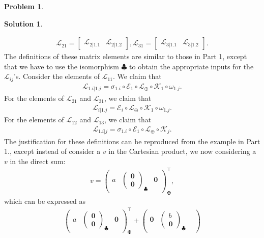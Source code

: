 \documentclass{article}
\theoremstyle{definition}
\newtheorem*{prob*}{Problem}
\newtheorem*{sln*}{Solution}
\newcommand{\lag}{\mathcal{L}}
\newcommand{\K}{\mathcal{K}}
\newcommand{\E}{\mathcal{E}}
\begin{document}
\begin{prob*}
\begin{sln*}
\begin{enumerate}
\begin{align*}
		\lag_{21} = \begin{bmatrix}
		\lag_{2|1.1}&\lag_{2|1.2}
		\end{bmatrix}, \lag_{31} = \begin{bmatrix}
		\lag_{3|1.1}&\lag_{3|1.2}
		\end{bmatrix}.
		\end{align*}
		The definitions of these matrix elements are similar to those in Part 1, except that we have to use the isomorphism $\clubsuit$ to obtain the appropriate inputs for the $\lag_{ij}$'s. Consider the elements of $\lag_{11}$. We claim that
		\begin{align*}
		\lag_{1.i|1.j} = \sigma_{1.i} \circ \E_1 \circ \lag_\oplus \circ \K_1 \circ \omega_{1.j}.
		\end{align*}
		For the elements of $\lag_{21}$ and $\lag_{31}$, we claim that
		\begin{align*}
		\lag_{i|1.j} = \E_i \circ \lag_\oplus \circ \K_{1} \circ \omega_{1.j}.
		\end{align*}
		For the elements of $\lag_{12}$ and $\lag_{13}$, we claim that
		\begin{align*}
		\lag_{1.i|j} = \sigma_{1.i} \circ \E_1 \circ \lag_\oplus \circ \K_j.
		\end{align*}
		The justification for these definitions can be reproduced from the example in Part 1., except instead of consider a $v$ in the Cartesian product, we now considering a $v$ in the direct sum:
		\begin{align*}
		v = 
		\begin{pmatrix}
		a & \begin{pmatrix}
		\mathbf{0}\\\mathbf{0}
		\end{pmatrix}_\clubsuit&
		\mathbf{0}
		\end{pmatrix}^\top_\maltese,
		\end{align*}
		which can be expressed as
		\begin{align*}
		\begin{pmatrix}
		a & \begin{pmatrix}
		\mathbf{0}\\\mathbf{0}
		\end{pmatrix}_\clubsuit&
		\mathbf{0}
		\end{pmatrix}^\top_\maltese
		+
		\begin{pmatrix}
		\mathbf{0} & \begin{pmatrix}
		b\\\mathbf{0}
		\end{pmatrix}_\clubsuit&

\end{pmatrix}
\end{align*}
\end{enumerate}
\end{sln*}
\end{prob*}
\end{document}
